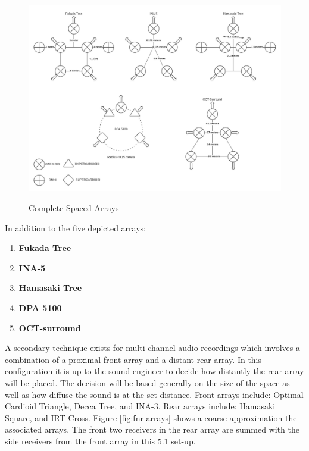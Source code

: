 \begin{figure}[ht!]%
\centering
\includegraphics[width=1.0\textwidth]{img/complete-spaced-arrays.jpeg} 
\label{fig:c-spaced-arrays}
\caption{Complete Spaced Arrays}
\end{figure}


In addition to the five depicted arrays:
\begin{enumerate}
    \item \textbf{Fukada Tree}
    \item \textbf{INA-5} 
    \item \textbf{Hamasaki Tree}
    \item \textbf{DPA 5100}
    \item \textbf{OCT-surround}
\end{enumerate}


A secondary technique exists for multi-channel audio recordings which involves a combination of a proximal front array and a distant rear array. In this configuration it is up to the sound engineer to decide how distantly the rear array will be placed. The decision will be based generally on the size of the space as well as how diffuse the sound is at the set distance. Front arrays include: Optimal Cardioid Triangle, Decca Tree, and INA-3. Rear arrays include: Hamasaki Square, and IRT Cross. Figure \ref{fig:fnr-arrays} shows a coarse approximation the associated arrays. The front two receivers in the rear array are summed with the side receivers from the front array in this 5.1 set-up. 

